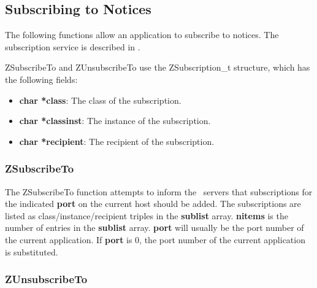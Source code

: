 %
\subsection{Subscribing to Notices}
\label{subscribing}

The following functions allow an application to subscribe to notices.
The subscription service is described in .

ZSubscribeTo and ZUnsubscribeTo use the ZSubscription_t structure, which
has the following fields:

\begin{itemize}
\item {\bf char *class}: The class of the subscription.
\item {\bf char *classinst}: The instance of the subscription.
\item {\bf char *recipient}: The recipient of the subscription.
\end{itemize}

\subsubsection{ZSubscribeTo}
\label{ZSubscribeTo}

\etemplate
{}

The ZSubscribeTo function attempts to inform the \Zephyr\ servers that
subscriptions for the indicated {\bf port} on the current host should
be added.  The subscriptions are listed as class/instance/recipient
triples in the {\bf sublist} array.  {\bf nitems} is the number of
entries in the {\bf sublist} array.  {\bf port} will usually be the
port number of the current application.  If {\bf port} is 0, the
port number of the current application is substituted.

\subsubsection{ZUnsubscribeTo}
\label{ZUnsubscribeTo}

